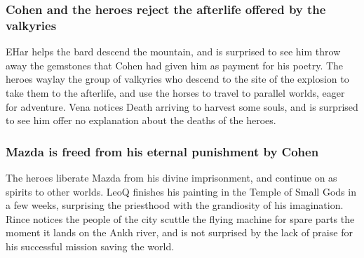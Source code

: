 \subsubsection{\Gls{Cohen} and the heroes reject the afterlife offered by the valkyries}
\Gls{EHar} helps the bard descend the mountain, and is surprised to see him throw away the gemstones
that \Gls{Cohen} had given him as payment for his poetry. The heroes waylay the group of valkyries
who descend to the site of the explosion to take them to the afterlife, and use the horses to
travel to parallel worlds, eager for adventure. \Gls{Vena} notices \Gls{Death} arriving to harvest
some souls, and is surprised to see him offer no explanation about the deaths of the heroes.

\subsubsection{\Gls{Mazda} is freed from his eternal punishment by \Gls{Cohen}}
The heroes liberate \Gls{Mazda} from his divine imprisonment, and continue on as spirits to other
worlds. \Gls{LeoQ} finishes his painting in the Temple of Small Gods in a few weeks, surprising
the priesthood with the grandiosity of his imagination. \Gls{Rince} notices the people of the city
scuttle the flying machine for spare parts the moment it lands on the Ankh river, and is not
surprised by the lack of praise for his successful mission saving the world.